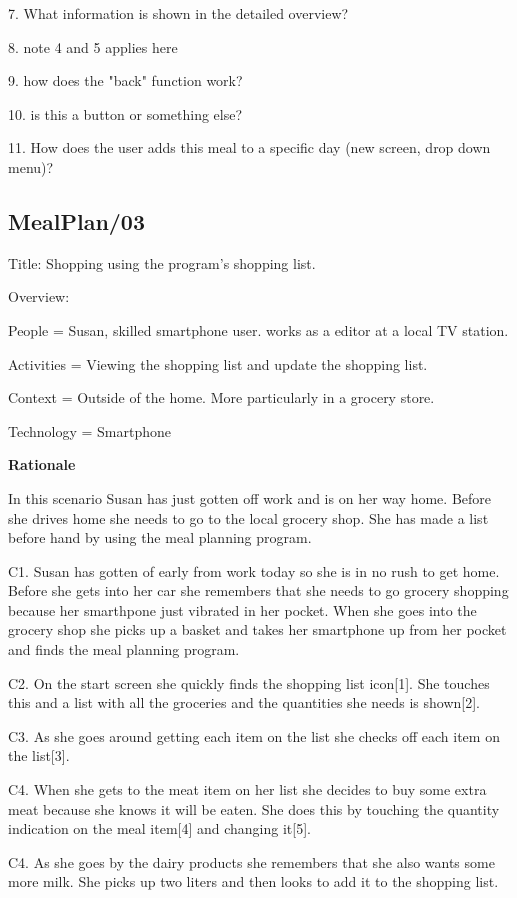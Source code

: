 7. What information is shown in the detailed overview?

8. note 4 and 5 applies here

9. how does the "back" function work?

10. is this a button or something else?

11. How does the user adds this meal to a specific day (new screen, drop down menu)?

\subsection{MealPlan/03} \label{MealPlan03}

Title: Shopping using the program's shopping list.

Overview:

	People = Susan, skilled smartphone user. works as a editor at a local TV station. 
	
	Activities = Viewing the shopping list and update the shopping list.

	Context = Outside of the home. More particularly in a grocery store.

	Technology = Smartphone
	
\textbf{Rationale}

In this scenario Susan has just gotten off work and is on her way home. Before she drives home she needs to go to the local grocery shop. She has made a list before hand by using the meal planning program.

	C1. Susan has gotten of early from work today so she is in no rush to get home. Before she gets into her car she remembers that she needs to go grocery shopping because her smarthpone just vibrated in her pocket. When she goes into the grocery shop she picks up a basket and takes her smartphone up from her pocket and finds the meal planning program.
	
	C2. On the start screen she quickly finds the shopping list icon[1]. She touches this and a list with all the groceries and the quantities she needs is shown[2].
	
	C3. As she goes around getting each item on the list she checks off each item on the list[3].
	
	C4. When she gets to the meat item on her list she decides to buy some extra meat because she knows it will be eaten. She does this by touching the quantity indication on the meal item[4] and changing it[5]. 	
	
	C4. As she goes by the dairy products she remembers that she also wants some more milk. She picks up two liters and then looks to add it to the shopping list.
	
